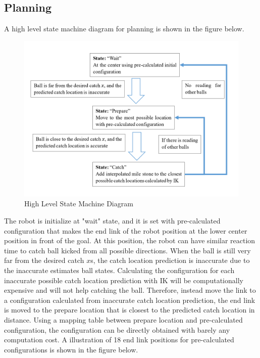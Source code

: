 \documentclass[a4paper]{article}
\begin{document}
\subsection{Planning}
A high level state machine diagram for planning is shown in the figure below. 
\begin{figure}[h]
\centering
\includegraphics[scale=0.8]{StateMachine.PNG}
\caption{High Level State Machine Diagram}
\end{figure}
The robot is initialize at "wait" state, and it is set with pre-calculated configuration that makes the end link of the robot position at the lower center position in front of the goal. At this position, the robot can have similar reaction time to catch ball kicked from all possible directions. When the ball is still very far from the desired catch $x$s, the catch location prediction is inaccurate due to the inaccurate estimates ball states. Calculating the configuration for each inaccurate possible catch location prediction with IK will be computationally expensive and will not help catching the ball. Therefore, instead move the link to a configuration calculated from inaccurate catch location prediction, the end link is moved to the prepare location that is closest to the predicted catch location in distance. Using a mapping table between prepare location and pre-calculated configuration, the configuration can be directly obtained with barely any computation cost. A illustration of 18 end link positions for pre-calculated configurations is shown in the figure below. 
\end{document}
